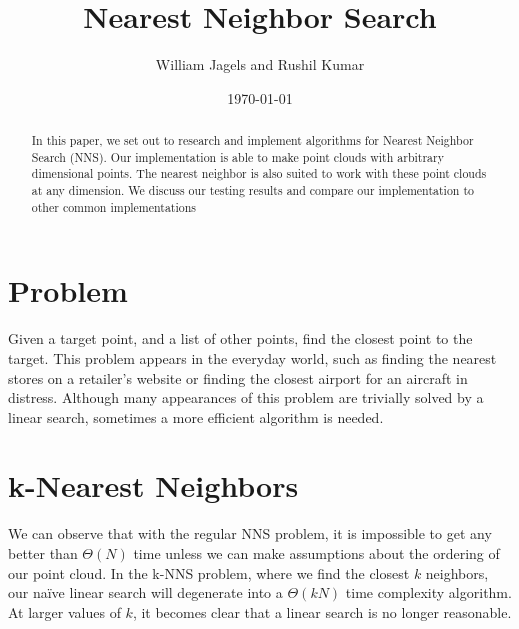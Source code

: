 \documentclass[a4paper,12pt]{article}
\title{Nearest Neighbor Search}
\author{William Jagels and Rushil Kumar}
\date{\today}
\begin{document}
\maketitle

\begin{abstract}
  In this paper, we set out to research and implement algorithms for Nearest Neighbor Search (NNS).
  Our implementation is able to make point clouds with arbitrary dimensional points.
  The nearest neighbor is also suited to work with these point clouds at any dimension.
  We discuss our testing results and compare our implementation to other common implementations
\end{abstract}

\section{Problem}
Given a target point, and a list of other points, find the closest point to the target.
This problem appears in the everyday world, such as finding the nearest stores on a
retailer's website or finding the closest airport for an aircraft in distress.
Although many appearances of this problem are trivially solved by a linear search,
sometimes a more efficient algorithm is needed.

\section{k-Nearest Neighbors}
We can observe that with the regular NNS problem, it is impossible to get any better than
$\Theta(N)$ time unless we can make assumptions about the ordering of our point cloud.
In the k-NNS problem, where we find the closest $k$ neighbors, our naïve linear search
will degenerate into a $\Theta(kN)$ time complexity algorithm.
At larger values of $k$, it becomes clear that a linear search is no longer reasonable.
\end{document}

